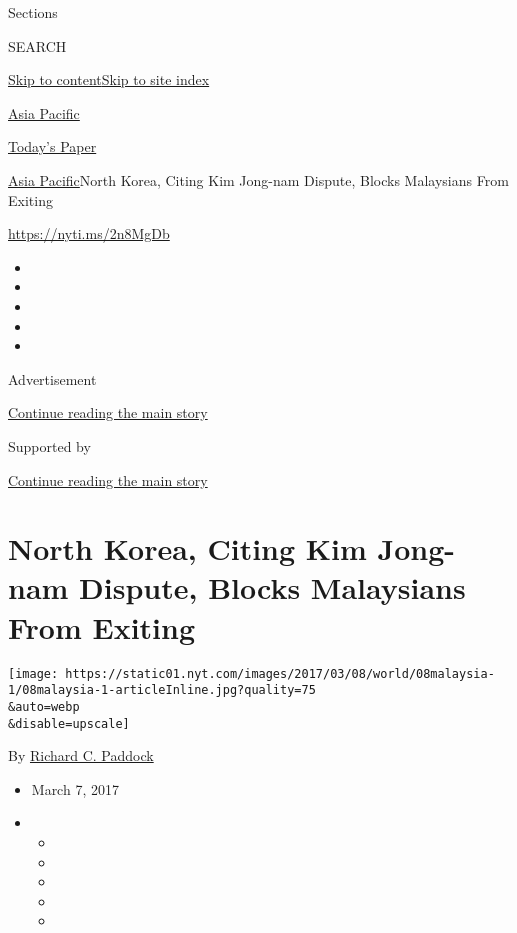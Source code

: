 Sections

SEARCH

\protect\hyperlink{site-content}{Skip to
content}\protect\hyperlink{site-index}{Skip to site index}

\href{https://www.nytimes.com/section/world/asia}{Asia Pacific}

\href{https://myaccount.nytimes.com/auth/login?response_type=cookie\&client_id=vi}{}

\href{https://www.nytimes.com/section/todayspaper}{Today's Paper}

\href{/section/world/asia}{Asia Pacific}\textbar{}North Korea, Citing
Kim Jong-nam Dispute, Blocks Malaysians From Exiting

\url{https://nyti.ms/2n8MgDb}

\begin{itemize}
\item
\item
\item
\item
\item
\end{itemize}

Advertisement

\protect\hyperlink{after-top}{Continue reading the main story}

Supported by

\protect\hyperlink{after-sponsor}{Continue reading the main story}

\hypertarget{north-korea-citing-kim-jong-nam-dispute-blocks-malaysians-from-exiting}{%
\section{North Korea, Citing Kim Jong-nam Dispute, Blocks Malaysians
From
Exiting}\label{north-korea-citing-kim-jong-nam-dispute-blocks-malaysians-from-exiting}}

\texttt{[image: https://static01.nyt.com/images/2017/03/08/world/08malaysia-1/08malaysia-1-articleInline.jpg?quality=75\\\&auto=webp\\\&disable=upscale]}

By \href{https://www.nytimes.com/by/richard-c-paddock}{Richard C.
Paddock}

\begin{itemize}
\item
  March 7, 2017
\item
  \begin{itemize}
  \item
  \item
  \item
  \item
  \item
  \end{itemize}
\end{itemize}

